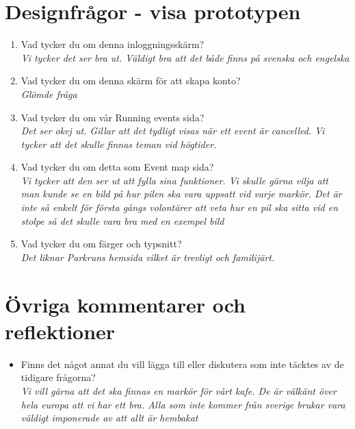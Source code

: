 \documentclass{article}
\begin{document}
\newpage
\section*{Designfrågor - visa prototypen}
\begin{enumerate}[label=\textbf{Fråga \arabic*:}]
    \item Vad tycker du om denna inloggningsskärm?\\
        \textit{Vi tycker det ser bra ut. Väldigt bra att det både finns på svenska och engelska}
    \item Vad tycker du om denna skärm för att skapa konto?\\
        \textit{Glömde fråga}
    \item Vad tycker du om vår Running events sida?\\
        \textit{Det ser okej ut. Gillar att det tydligt visas när ett event är cancelled. Vi tycker att det skulle finnas teman vid högtider.}
    \item Vad tycker du om detta som Event map sida?\\
        \textit{Vi tycker att den ser ut att fylla sina funktioner. Vi skulle gärna vilja att man kunde se en bild på hur pilen ska vara uppsatt vid varje markör. Det är inte så enkelt för första gångs volontärer att veta hur en pil ska sitta vid en stolpe så det skulle vara bra med en exempel bild}
    \item Vad tycker du om färger och typsnitt?\\
        \textit{Det liknar Parkruns hemsida vilket är trevligt och familijärt.}
\end{enumerate}

\section*{Övriga kommentarer och reflektioner}
\begin{itemize}[label=]
    \item Finns det något annat du vill lägga till eller diskutera som inte täcktes av de tidigare frågorna?\\
    \textit{Vi vill gärna att det ska finnas en markör för vårt kafe. De är välkänt över hela europa att vi har ett bra. Alla som inte kommer från sverige brukar vara väldigt imponerade av att allt är hembakat}
\end{itemize}
\thispagestyle{empty}
\end{document}
